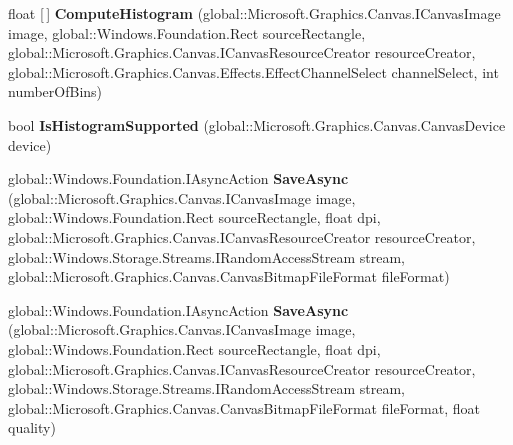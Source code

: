 \begin{DoxyCompactItemize}
\item 
\mbox{\label{interface_microsoft_1_1_graphics_1_1_canvas_1_1_i_canvas_image_statics_a21324f0dd43dd52006fc02fb9aa474d3}} 
float \mbox{[}$\,$\mbox{]} {\bfseries Compute\+Histogram} (global\+::\+Microsoft.\+Graphics.\+Canvas.\+I\+Canvas\+Image image, global\+::\+Windows.\+Foundation.\+Rect source\+Rectangle, global\+::\+Microsoft.\+Graphics.\+Canvas.\+I\+Canvas\+Resource\+Creator resource\+Creator, global\+::\+Microsoft.\+Graphics.\+Canvas.\+Effects.\+Effect\+Channel\+Select channel\+Select, int number\+Of\+Bins)
\item 
\mbox{\label{interface_microsoft_1_1_graphics_1_1_canvas_1_1_i_canvas_image_statics_ae36ced4f89421bf05ceea6e51eb6f95b}} 
bool {\bfseries Is\+Histogram\+Supported} (global\+::\+Microsoft.\+Graphics.\+Canvas.\+Canvas\+Device device)
\item 
\mbox{\label{interface_microsoft_1_1_graphics_1_1_canvas_1_1_i_canvas_image_statics_a24c2e03f2a0d0284e0926c456f6c05cd}} 
global\+::\+Windows.\+Foundation.\+I\+Async\+Action {\bfseries Save\+Async} (global\+::\+Microsoft.\+Graphics.\+Canvas.\+I\+Canvas\+Image image, global\+::\+Windows.\+Foundation.\+Rect source\+Rectangle, float dpi, global\+::\+Microsoft.\+Graphics.\+Canvas.\+I\+Canvas\+Resource\+Creator resource\+Creator, global\+::\+Windows.\+Storage.\+Streams.\+I\+Random\+Access\+Stream stream, global\+::\+Microsoft.\+Graphics.\+Canvas.\+Canvas\+Bitmap\+File\+Format file\+Format)
\item 
\mbox{\label{interface_microsoft_1_1_graphics_1_1_canvas_1_1_i_canvas_image_statics_a1d356baa8a7f7e5d8a5a583ba30a2008}} 
global\+::\+Windows.\+Foundation.\+I\+Async\+Action {\bfseries Save\+Async} (global\+::\+Microsoft.\+Graphics.\+Canvas.\+I\+Canvas\+Image image, global\+::\+Windows.\+Foundation.\+Rect source\+Rectangle, float dpi, global\+::\+Microsoft.\+Graphics.\+Canvas.\+I\+Canvas\+Resource\+Creator resource\+Creator, global\+::\+Windows.\+Storage.\+Streams.\+I\+Random\+Access\+Stream stream, global\+::\+Microsoft.\+Graphics.\+Canvas.\+Canvas\+Bitmap\+File\+Format file\+Format, float quality)

\end{DoxyCompactItemize}
